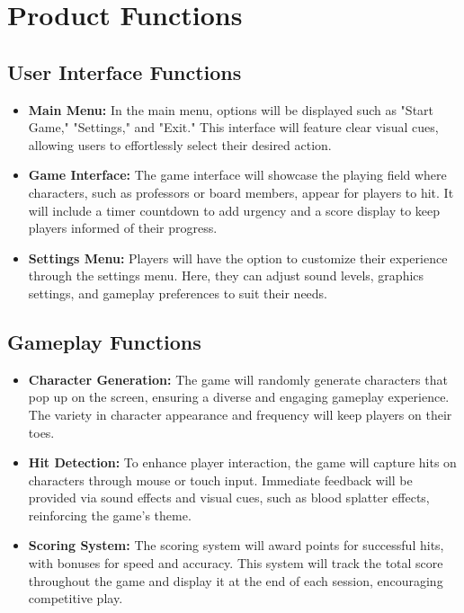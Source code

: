 \documentclass{article}
\begin{document}
\newpage
\section{Product Functions}
\subsection{User Interface Functions}
\begin{itemize}
    \item \textbf{Main Menu:} In the main menu, options will be displayed such as "Start Game," "Settings," and "Exit." This interface will feature clear visual cues, allowing users to effortlessly select their desired action.
    \item \textbf{Game Interface:} The game interface will showcase the playing field where characters, such as professors or board members, appear for players to hit. It will include a timer countdown to add urgency and a score display to keep players informed of their progress.
    \item \textbf{Settings Menu:} Players will have the option to customize their experience through the settings menu. Here, they can adjust sound levels, graphics settings, and gameplay preferences to suit their needs.
\end{itemize}

\subsection{Gameplay Functions}
\begin{itemize}
    \item \textbf{Character Generation:} The game will randomly generate characters that pop up on the screen, ensuring a diverse and engaging gameplay experience. The variety in character appearance and frequency will keep players on their toes.
    \item \textbf{Hit Detection:} To enhance player interaction, the game will capture hits on characters through mouse or touch input. Immediate feedback will be provided via sound effects and visual cues, such as blood splatter effects, reinforcing the game's theme.
    \item \textbf{Scoring System:} The scoring system will award points for successful hits, with bonuses for speed and accuracy. This system will track the total score throughout the game and display it at the end of each session, encouraging competitive play.
\end{itemize}
\end{document}
